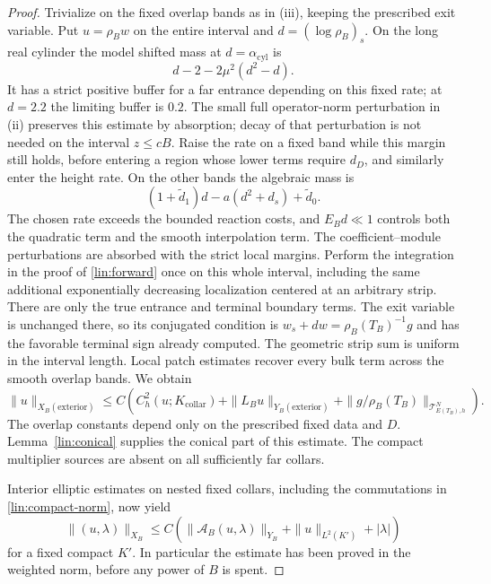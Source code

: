 \begin{proof}
Trivialize on the fixed overlap bands as in (iii), keeping the prescribed
exit variable.  Put $u=\rho_B w$ on the entire interval and
$d=(\log\rho_B)_s$.  On the long real cylinder the model shifted mass at
$d=\alpha_{\mathrm{cyl}}$ is
\[
 d-2-2\mu^2(d^2-d).
\]
It has a strict positive buffer for a far entrance depending on this fixed
rate; at $d=2.2$ the limiting buffer is $0.2$.  The small full
operator-norm perturbation in (ii) preserves this estimate by absorption;
decay of that perturbation is not needed on the interval $z\le cB$.
Raise the rate on a fixed band while this margin still holds, before
entering a region whose lower terms require $d_D$, and similarly enter
the height rate.  On the other bands the algebraic mass is
\[
 (1+\widetilde d_1)d-a(d^2+d_s)+\widetilde d_0.
\]
The chosen rate exceeds the bounded reaction costs, and $E_Bd\ll1$
controls both the quadratic term and the smooth interpolation term.
The coefficient--module perturbations are absorbed with the strict
local margins.  Perform the integration in the proof of
\eqref{lin:forward} once on this whole interval, including the same
additional exponentially decreasing localization centered at an arbitrary
strip.  There are only the true entrance and terminal boundary terms.
The exit variable is unchanged there, so its conjugated condition is
$w_s+d w=\rho_B(T_B)^{-1}g$ and has the favorable terminal sign already
computed.  The geometric strip sum is uniform in the interval length.
Local patch estimates recover every bulk term across the smooth overlap
bands.  We obtain
\begin{equation}\label{lin:exterior-global}
 \|u\|_{X_B(\mathrm{exterior})}
 \le C\left(C_h^2(u;K_{\mathrm{collar}})
       +\|L_Bu\|_{Y_B(\mathrm{exterior})}
       +\|g/\rho_B(T_B)\|_{\mathcal T^N_{E(T_B),h}}\right).
\end{equation}
The overlap constants depend only on the prescribed fixed data and $D$.
Lemma~\ref{lin:conical} supplies the
conical part of this estimate.  The compact multiplier sources are
absent on all sufficiently far collars.

Interior elliptic estimates on nested fixed collars, including the
commutations in \eqref{lin:compact-norm}, now yield
\begin{equation}\label{lin:compact-remainder}
 \|(u,\lambda)\|_{X_B}
 \le C\left(\|\mathcal A_B(u,\lambda)\|_{Y_B}
                    +\|u\|_{L^2(K')}+|\lambda|\right)
\end{equation}
for a fixed compact $K'$.  In particular the estimate has been proved
in the weighted norm, before any power of $B$ is spent.


\end{proof}
